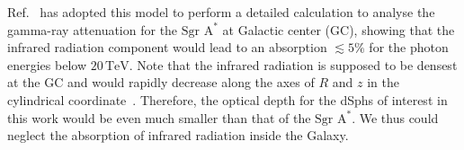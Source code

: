 \documentclass[12pt,aps,prd,amsmath,amssymb,showpacs,floats,floatfix,nofootinbib]{revtex4-1}
\def\TeV{\mathrm{TeV}} %
\begin{document}
Ref.~\cite{Zhang:2005tp} has adopted this model to perform a detailed calculation to analyse the gamma-ray attenuation for the $\mathrm{Sgr\,\,A^*}$ at Galactic center (GC), showing that the infrared radiation component would lead to an absorption $\lesssim5\%$ for the photon energies below $20\,\TeV$.
Note that the infrared radiation is supposed to be densest at the GC and would rapidly decrease along the axes of $R$ and $z$ in the cylindrical coordinate~\cite{Strong:1998fr}.
Therefore, the optical depth for the dSphs of interest in this work would be even much smaller than that of the $\mathrm{Sgr\,\,A^*}$.
We thus could neglect the absorption of infrared radiation inside the Galaxy.


%
%

\end{document}
